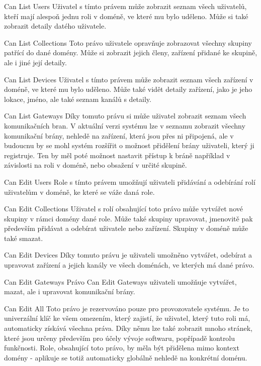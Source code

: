 \def\myprefix{P}
\begin{enumfunctional}[style=nextline]
\item[Can List Users]
Uživatel s tímto právem může zobrazit seznam všech uživatelů, kteří mají alespoň jednu roli v doméně, ve které mu bylo uděleno. Může si také zobrazit detaily datého uživatele.
\item[Can List Collections]
Toto právo uživatele opravňuje zobrazovat všechny skupiny patřící do dané domény. Může si zobrazit jejich členy, zařízení přidané ke skupině, ale i jiné její detaily.
\item[Can List Devices]
Uživatel s tímto právem může zobrazit seznam všech zařízení v doméně, ve které mu bylo uděleno. Může také vidět detaily zařízení, jako je jeho lokace, jméno, ale také seznam kanálů s detaily.
\item[Can List Gateways]
Díky tomuto právu si může uživatel zobrazit seznam všech komunikačních bran. V aktuální verzi systému lze v seznamu zobrazit všechny komunikační brány, nehledě na zařízení, která jsou přes ni připojená, ale v budoucnu by se mohl systém rozšířit o možnost přidělení brány uživateli, který ji registruje. Ten by měl poté možnost nastavit přístup k bráně například v závislosti na roli v doméně, nebo obsažení v určité skupině.
\item[Can Edit Users]
Role s tímto právem umožňují uživateli přidávání a odebírání rolí uživatelům v doméně, ke které se váže daná role.
\item[Can Edit Collections]
Uživatel s rolí obsahující toto právo může vytvářet nové skupiny v rámci domény dané role. Může také skupiny upravovat, jmenovitě pak především přidávat a odebírat uživatele nebo zařízení. Skupiny v doméně může také smazat.
\item[Can Edit Devices]
Díky tomuto právu je uživateli umožněno vytvářet, odebírat a upravovat zařízení a jejich kanály ve všech doménách, ve kterých má dané právo.
\item[Can Edit Gateways]
Právo Can Edit Gateways uživateli umožňuje vytvářet, mazat, ale i upravovat komunikační brány.
\item[Can Edit All]
Toto právo je rezervováno pouze pro provozovatele systému. Je to univerzální klíč ke všem omezením, který zajistí, že uživatel, který tuto roli má, automaticky získává všechna práva. Díky němu lze také zobrazit mnoho stránek, které jsou určeny především pro účely vývoje softwaru, popřípadě kontrolu funkčnosti. Role, obsahující toto právo, by měla být přidělena mimo kontext domény - aplikuje se totiž automaticky globálně nehledě na konkrétní doménu.
\end{enumfunctional}

